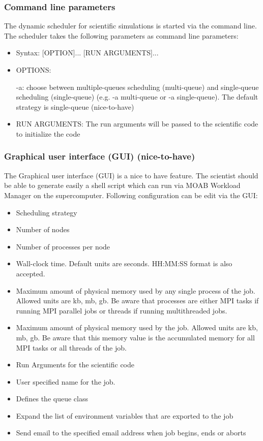 	\subsubsection{Command line parameters}
		The dynamic scheduler for scientific simulations is started via the command line. The scheduler takes the following parameters as command line parameters:
	
		\begin{itemize}	
			\item Syntax: [OPTION]... [RUN ARGUMENTS]...
				
			\item OPTIONS:
							
				\subitem -a: choose between multiple-queues scheduling (multi-queue) and single-queue scheduling (single-queue) (e.g. -a multi-queue or -a single-queue). The default strategy is single-queue (nice-to-have)
					
			\item RUN ARGUMENTS:
				\subitem The run arguments will be passed to the scientific code to initialize the code
		\end{itemize}
		
	\subsubsection{Graphical user interface (GUI) (nice-to-have)}
		The Graphical user interface (GUI) is a nice to have feature. The scientist should be able to generate easily a shell script which can run via MOAB Workload Manager on the supercomputer. Following configuration can be edit via the GUI:
		
		\begin{itemize}
			\item Scheduling strategy
			\item Number of nodes
			\item Number of processes per node
			\item Wall-clock time. Default units are seconds. 
			HH:MM:SS format is also accepted.
			\item Maximum amount of physical memory used by any single process of the job. Allowed units are kb, mb, gb. Be aware that processes are either MPI tasks if running MPI parallel jobs or threads if running multithreaded jobs.
			\item Maximum amount of physical memory used by the job.
			Allowed units are kb, mb, gb. Be aware that this memory value is the accumulated memory for all MPI tasks or all threads of the job.
			\item Run Arguments for the scientific code
			\item User specified name for the job.
			\item Defines the queue class
			\item Expand the list of environment variables that are exported to the job
			\item Send email to the specified email address when job begins, ends or aborts
		\end{itemize}
	
	